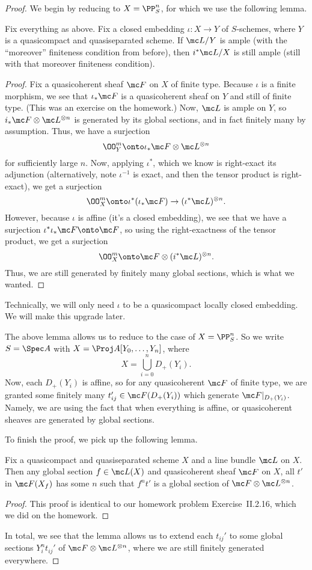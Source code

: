 \documentclass[../notes.tex]{subfiles}
\begin{document}
\begin{proof}
	We begin by reducing to $X=\PP^n_S$, for which we use the following lemma.
	\begin{lemma} %
		Fix everything as above. Fix a closed embedding $\iota\colon X\to Y$ of $S$-schemes, where $Y$ is a quasicompact and quasiseparated scheme. If $\mc L/Y$ is ample (with the ``moreover'' finiteness condition from before), then $i^*\mc L/X$ is still ample (still with that moreover finiteness condition).
	\end{lemma}
	\begin{proof}
		Fix a quasicoherent sheaf $\mc F$ on $X$ of finite type. Because $\iota$ is a finite morphism, we see that $\iota_*\mc F$ is a quasicoherent sheaf on $Y$ and still of finite type. (This was an exercise on the homework.) Now, $\mc L$ is ample on $Y$, so $i_*\mc F\otimes\mc L^{\otimes n}$ is generated by its global sections, and in fact finitely many by assumption. Thus, we have a surjection
		\[\OO_Y^m\onto\iota_*\mc F\otimes\mc L^{\otimes n}\]
		for sufficiently large $n$. Now, applying $\iota^*$, which we know is right-exact its adjunction (alternatively, note $\iota^{-1}$ is exact, and then the tensor product is right-exact), we get a surjection
		\[\OO_X^m\onto\iota^*(\iota_*\mc F)\to(\iota^*\mc L)^{\otimes n}.\]
		However, because $\iota$ is affine (it's a closed embedding), we see that we have a surjection $\iota^*\iota_*\mc F\onto\mc F$, so using the right-exactness of the tensor product, we get a surjection
		\[\OO_X^m\onto\mc F\otimes(i^*\mc L)^{\otimes n}.\]
		Thus, we are still generated by finitely many global sections, which is what we wanted.
	\end{proof}
	\begin{remark}
		Technically, we will only need $\iota$ to be a quasicompact locally closed embedding. We will make this upgrade later.
	\end{remark}
	The above lemma allows us to reduce to the case of $X=\PP^n_S$. So we write $S=\Spec A$ with $X=\Proj A[Y_0,\ldots,Y_n]$, where
	\[X=\bigcup_{i=0}^nD_+(Y_i).\]
	Now, each $D_+(Y_i)$ is affine, so for any quasicoherent $\mc F$ of finite type, we are granted some finitely many $t_{ij}'\in\mc F(D_+(Y_i))$ which generate $\mc F|_{D_+(Y_i)}$. Namely, we are using the fact that when everything is affine, or quasicoherent sheaves are generated by global sections.

	To finish the proof, we pick up the following lemma.
	\begin{lemma}
		Fix a quasicompact and quasiseparated scheme $X$ and a line bundle $\mc L$ on $X$. Then any global section $f\in\mc L(X)$ and quasicoherent sheaf $\mc F$ on $X$, all $t'$in $\mc F(X_f)$ has some $n$ such that $f^nt'$ is a global section of $\mc F\otimes\mc L^{\otimes n}$.
	\end{lemma}
	\begin{proof}
		This proof is identical to our homework problem Exercise~II.2.16, which we did on the homework.
	\end{proof}
	In total, we see that the lemma allows us to extend each $t_{ij}'$ to some global sections $Y_i^nt_{ij}'$ of $\mc F\otimes\mc L^{\otimes n}$, where we are still finitely generated everywhere.
\end{proof}
\end{document}
